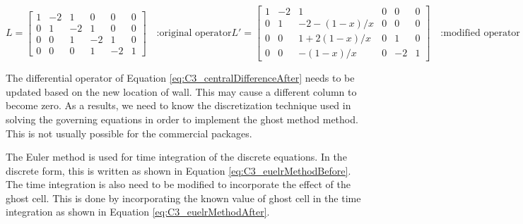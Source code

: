 \begin{subequations}
\begin{equation}\label{eq:C3_centralDifferenceBefore}
	L = 
	\begin{bmatrix}
	1 & -2 & 1 & 0 & 0 & 0 \\
	0 & 1 & -2 & 1 & 0 & 0 \\
	0 & 0 & 1 & -2 & 1 & 0 \\
	0 & 0 & 0 & 1 & -2 & 1
	\end{bmatrix} \quad \text{:original operator}
\end{equation}
\begin{equation}\label{eq:C3_centralDifferenceAfter}
	L' = 
	\begin{bmatrix}
	1 & -2 & 1 & 0 & 0 & 0 \\
	0 & 1 & -2-(1-x)/x & 0 & 0 & 0 \\
	0 & 0 & 1+2(1-x)/x & 0 & 1 & 0 \\
	0 & 0 & -(1-x)/x & 0 & -2 & 1
	\end{bmatrix} \quad \text{:modified operator}
\end{equation}
\end{subequations}

The differential operator of Equation \eqref{eq:C3_centralDifferenceAfter} needs to be updated based on the new location of wall. This may cause a different column to become zero. As a results, we need to know the discretization technique used in solving the governing equations in order to implement the ghost method method. This is not usually possible for the commercial packages.

The Euler method is used for time integration of the discrete equations. In the discrete form, this is written as shown in Equation \eqref{eq:C3_euelrMethodBefore}. The time integration is also need to be modified to incorporate the effect of the ghost cell. This is done by incorporating the known value of ghost cell in the time integration as shown in Equation \eqref{eq:C3_euelrMethodAfter}.

